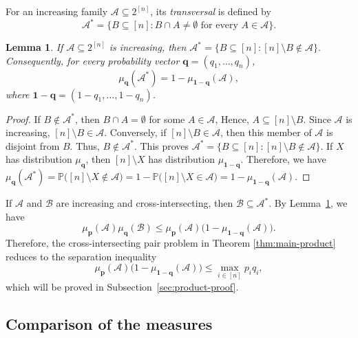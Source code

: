 \documentclass[11pt]{article}
\numberwithin{equation}{section}
\newtheorem{lemma}[theorem]{Lemma}
\theoremstyle{definition}
\theoremstyle{remark}
\begin{document}
For an increasing family $\mathcal{A}\subseteq2^{[n]}$,  its \textit{transversal} is defined by
$$
 \mathcal{A}^*=\{B\subseteq[n]:B\cap A\neq\emptyset\text{ for every }A\in\mathcal{A}\}.
$$

\begin{lemma}
\label{lem:transversal}
If $\mathcal{A}\subseteq2^{[n]}$ is increasing, then
$
 \mathcal{A}^*=\{B\subseteq[n]:[n]\setminus B\notin\mathcal{A}\}.
$
Consequently, for every probability vector $\mathbf q=(q_1,\ldots,q_n)$,
$$
 \mu_{\mathbf q}(\mathcal{A}^*)
 =1-\mu_{\mathbf 1-\mathbf q}(\mathcal{A}),
$$
where $\mathbf 1-\mathbf q=(1-q_1,\ldots,1-q_n)$.
\end{lemma}

\begin{proof}
If $B\notin\mathcal{A}^*$, then $B\cap A=\emptyset$ for some $A\in\mathcal{A}$, Hence, $A\subseteq[n]\setminus B$. Since $\mathcal{A}$ is increasing, $[n]\setminus B\in\mathcal{A}$. Conversely, if $[n]\setminus B\in\mathcal{A}$, then this member of $\mathcal{A}$ is disjoint from $B$. Thus, $B\notin\mathcal{A}^*$. This proves $
 \mathcal{A}^*=\{B\subseteq[n]:[n]\setminus B\notin\mathcal{A}\}.
$
If $X$ has distribution $\mu_{\mathbf q}$, then $[n]\setminus X$ has distribution $\mu_{\mathbf 1-\mathbf q}$. Therefore, we have
$
 \mu_{\mathbf q}(\mathcal{A}^*)=\mathbb P\bigl([n]\setminus X\notin\mathcal{A}\bigr)=1-\mathbb P\bigl([n]\setminus X\in\mathcal{A}\bigr)=1-\mu_{\mathbf 1-\mathbf q}(\mathcal{A}).
$
\end{proof}

If $\mathcal{A}$ and $\mathcal{B}$ are increasing and cross-intersecting, then
$
 \mathcal{B}\subseteq\mathcal{A}^*.
$
By Lemma~\ref{lem:transversal}, we have
$$
 \mu_{\mathbf p}(\mathcal{A})\mu_{\mathbf q}(\mathcal{B})
 \leq
 \mu_{\mathbf p}(\mathcal{A})
 \bigl(1-\mu_{\mathbf 1-\mathbf q}(\mathcal{A})\bigr).
 $$
Therefore, the cross-intersecting pair problem in Theorem \ref{thm:main-product}  reduces to the separation inequality 
\begin{equation}
 \mu_{\mathbf p}(\mathcal{A})
 \bigl(1-\mu_{\mathbf 1-\mathbf q}(\mathcal{A})\bigr)
 \leq \max_{i\in[n]}p_iq_i,
 \label{eq:separation}
\end{equation}
which will be
proved
in Subsection~\ref{sec:product-proof}.
\subsection{Comparison of the  measures}
\end{document}
